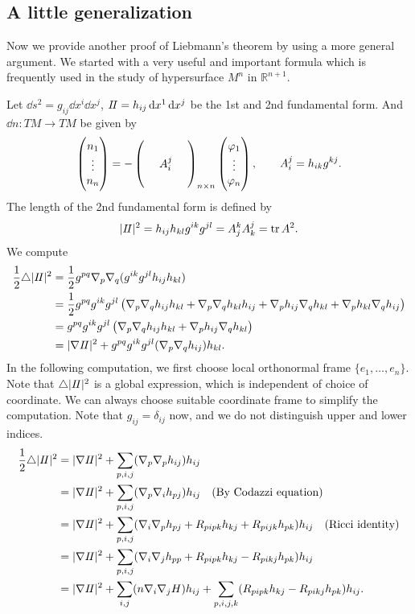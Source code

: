\subsection{A little generalization}
Now we provide another proof of Liebmann's theorem by using a more general argument.
We started with a very useful and important formula which is frequently used in the
study of hypersurface \(M^n\) in \(\mathbb{R}^{n+1}\).

Let \(\dd{s}^2=g_{ij}\dd{x^i}\dd{x^j}\), \(I\!I=h_{ij}\dd{x^1}\dd{x^j}\) be the 1st
and 2nd fundamental form. And \(\dd{n}\colon TM\to TM\) be given by \[
    \begin{pmatrix}
        n_1 \\ \vdots \\ n_n
    \end{pmatrix}=-\begin{pmatrix}
    \\
    \ & A_i^j & \ \\
    \ 
    \end{pmatrix}_{n\times n}\begin{pmatrix}
        \vphi_1 \\ \vdots \\ \vphi_n
    \end{pmatrix},\qquad A_i^j=h_{ik}g^{kj}
.\] The length of the 2nd fundamental form is defined by \[
    |I\!I|^2=h_{ij}h_{kl}g^{ik}g^{jl}=A_j^k A_k^j=\tr A^2
.\] We compute
\begin{align*}
    \frac{1}{2}\triangle |I\!I|^2&=\frac{1}{2}g^{pq}\nabla_p\nabla_q(g^{ik}g^{jl}h_{ij}
    h_{kl}) \\ &=\frac{1}{2}g^{pq}g^{ik}g^{jl}\left(\nabla_p\nabla_q h_{ij}h_{kl}
    +\nabla_p\nabla_q h_{kl}h_{ij}+\nabla_p h_{ij}\nabla_q h_{kl}+\nabla_p h_{kl}
    \nabla_q h_{ij}\right) \\
    &=g^{pq}g^{ik}g^{jl}\left(\nabla_p\nabla_q h_{ij}h_{kl}+\nabla_p h_{ij}\nabla_q
    h_{kl}\right) \\
    &=|\nabla I\!I|^2+g^{pq}g^{ik}g^{jl}(\nabla_p\nabla_q h_{ij})h_{kl}
.\end{align*}
In the following computation, we first choose local orthonormal frame \(\{e_1,\ldots,
e_n\}\). Note that \(\triangle |I\!I|^2\) is a global expression, which is independent
of choice of coordinate. We can always choose suitable coordinate frame to simplify
the computation. Note that \(g_{ij}=\delta_{ij}\) now, and we do not distinguish
upper and lower indices.
\begin{align*}
    \frac{1}{2}\triangle |I\!I|^2&=|\nabla I\!I|^2+\sum_{p,i,j}(\nabla_p\nabla_p h_{ij})
    h_{ij} \\ &=|\nabla I\!I|^2+\sum_{p,i,j}(\nabla_p\nabla_i h_{pj})h_{ij}
    \quad \text{(By Codazzi equation)} \\
    &=|\nabla I\!I|^2+\sum_{p,i,j}(\nabla_i\nabla_p h_{pj}+R_{pipk}h_{kj}+R_{pijk}h_{pk})
    h_{ij} \quad \text{(Ricci identity)} \\
    &=|\nabla I\!I|^2+\sum_{p,i,j}(\nabla_i\nabla_j h_{pp}+R_{pipk}h_{kj}-R_{pikj}h_{pk})
    h_{ij} \\
    &=|\nabla I\!I|^2+\sum_{i,j}(n\nabla_i\nabla_j H)h_{ij}
    +\sum_{p,i,j,k}(R_{pipk}h_{kj}-R_{pikj}h_{pk})h_{ij}
.\end{align*}
